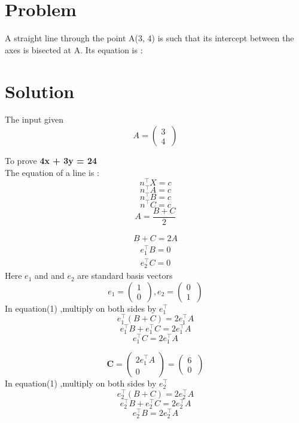 \documentclass[10pt, a4paper]{article}
\title{\mytitle}
\author{\myauthor\hspace{1em}\\\contact\\FWC22098         IITH-Future Wireless Communications             Assignment-matrices\hspace{0.8em}\hspace{0.5em}\mymodule}
\date{}
\begin{document}
 \maketitle
     \tableofcontents 
    \begin{figure}
        \centering
        \label{fig:my_label}
    \end{figure}
  \textbf{}{\mykeywords}
 \section{Problem}
 A straight line through the point A(3, 4) is such that its intercept between the axes is bisected at A. Its equation is :
      \section{Solution}
   \begin{center}
The input given 
\boldmath
$$A=\begin{pmatrix} 3\\ 4\ \end{pmatrix}$$
\end{center}
To prove \textbf{4x + 3y = 24}\\
The equation of a line is :
$$n^{\top}X=c$$
$$n^{\top}A=c$$
$$n^{\top}B=c$$
$$n^{\top}C=c$$
$$A = \frac{B+C}{2}$$
 \begin{center}
\begin{align}
B+C = 2A
\end{align}
\begin{align}
e_1^{\top}B=0
\end{align}
\begin{align}
e_2^{\top}C=0
\end{align}
Here $e_1$ and and $e_2$ are standard basis vectors 
$$e_1=\begin{pmatrix} 1\\ 0\ \end{pmatrix}  ,  e_2=\begin{pmatrix} 0\\ 1\ \end{pmatrix}$$
In equation(1) ,multiply on both sides by $e_1^{\top}$ 
$$e_1^{\top}(B+C)=2e_1^{\top}A$$
$$e_1^{\top}B+e_1^{\top}C=2e_1^{\top}A$$
$$e_1^{\top}C=2e_1^{\top}A$$
 \end{center}
$$\textbf{C}=\begin{pmatrix} 2e_1^{\top}A\\ 0\ \end{pmatrix}=\begin{pmatrix} 6\\ 0\ \end{pmatrix}$$
In equation(1) ,multiply on both sides by $e_2^{\top}$ 
$$e_2^{\top}(B+C)=2e_2^{\top}A$$
$$e_2^{\top}B+e_2^{\top}C=2e_2^{\top}A$$
$$e_2^{\top}B=2e_2^{\top}A$$
\end{document}
